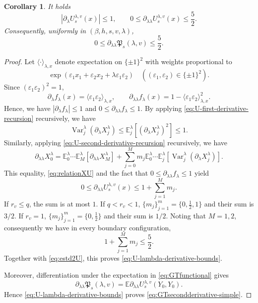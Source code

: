 \documentclass[11pt]{article}
\newtheorem{corollary}[theorem]{Corollary}
\numberwithin{equation}{section}
\newcommand{\E}{\mathbb{E}}
\newcommand{\1}{\mathbf 1}
\begin{document}
\begin{corollary}\label{cor: technical lemma for U and Psi}
It holds
    \begin{equation}
\left|\partial_\lambda U_s^{\lambda,v}(x)\right|\le1,
\qquad
0\le
\partial_{\lambda\lambda}U_s^{\lambda,v}(x)
\le\frac52.
\label{eq:U-lambda-derivative-bounds}
\end{equation}
Consequently, uniformly in $(\beta,h,s,v,\lambda)$,
\begin{equation}
0\leq \partial_{\lambda\lambda}\mathfrak P_s(\lambda,v)\leq \frac52.
 \label{eq:GTsecondderivative-simple}
\end{equation}
\end{corollary}
\begin{proof}
Let $\langle\cdot\rangle_{\lambda,x}$ denote expectation on
$\{\pm1\}^2$ with weights proportional to
\[
 \exp(\varepsilon_1x_1+\varepsilon_2x_2
             +\lambda\varepsilon_1\varepsilon_2) \quad ( (\varepsilon _1 , \varepsilon _2) \in \{ \pm 1 \} ^2 ).
\]
Since $(\varepsilon_1\varepsilon_2)^2=1$,
\[
 \partial_\lambda f_\lambda(x)
 =\langle\varepsilon_1\varepsilon_2\rangle_{\lambda,x},
 \qquad
 \partial_{\lambda\lambda}f_\lambda(x)
 =1-\langle\varepsilon_1\varepsilon_2\rangle_{\lambda,x}^2.
\]
Hence, we have $|\partial_\lambda f_\lambda|\le1$ and
$0\le\partial_{\lambda\lambda}f_\lambda\le1$.
By applying \eqref{eq:U-first-derivative-recursion} recursively, we have
\[
 \operatorname{Var}_j^\lambda(\partial_\lambda X_j^\lambda)
 \le \E_j^\lambda[(\partial_\lambda X_j^\lambda)^2]
 \le1.
\]
Similarly, applying \eqref{eq:U-second-derivative-recursion} recursively, we have 
\[
\partial_{\lambda\lambda}X_0^\lambda = \E_0^\lambda \cdots \E_M^\lambda
\left[
\partial_{\lambda\lambda}X_M^\lambda
\right]
+
\sum _{j=0}^M m_j
\E_0^\lambda \cdots \E_j^\lambda \left[ \operatorname{Var}_j^\lambda
\left(
\partial_\lambda X_j^\lambda
\right) \right] .
\]
This equality, \eqref{eq:relationXU} and the fact that $0\le\partial_{\lambda\lambda}f_\lambda\le1$ yield
\begin{equation}\label{eq:estd2U}
 0\le\partial_{\lambda\lambda}U_s^{\lambda,v}(x)
 \le1+\sum_{j=1}^Mm_j.
\end{equation}
If $r_v\le q$, the sum is at most $1$.  If
$q<r_v<1$, $\{ m_j\} _{j=1}^m = \{ 0,\frac12,1\}$ and their sum is $3/2$.
If $r_v=1$, $\{ m_j\} _{j=1}^m = \{ 0,\frac12\}$ and their sum is $1/2$.
Noting that $M=1,2$, consequently we have in every boundary configuration,
\[
 1+\sum_{j=1}^Mm_j\le\frac52.
\]
Together with \eqref{eq:estd2U}, this proves
\eqref{eq:U-lambda-derivative-bounds}.

Moreover, differentiation under the expectation in
\eqref{eq:GTfunctional}
gives
\[
 \partial_{\lambda\lambda}\mathfrak P_s(\lambda,v)
 =\E\partial_{\lambda\lambda}
   U_s^{\lambda,v}(Y_0,Y_0).
\]
Hence \eqref{eq:U-lambda-derivative-bounds} proves
\eqref{eq:GTsecondderivative-simple}.
\end{proof}
\end{document}
